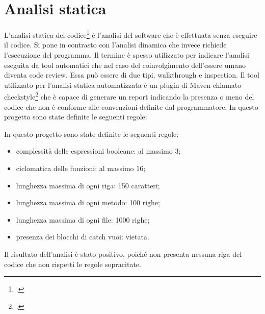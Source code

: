 \section{Analisi statica}\label{sec:analisi-statica}

L'analisi statica del codice\footcite{site:analisi_static} è l'analisi del software che è effettuata senza eseguire
il codice.
Si pone in contrasto con l'analisi dinamica che invece richiede l'esecuzione del
programma.
Il termine è spesso utilizzato per indicare l'analisi eseguita da tool
automatici che nel caso del coinvolgimento dell'essere umano diventa code review.
Essa può  essere di due tipi, \gls{walkthrough} e \gls{inspection}.
Il tool utilizzato per l'analisi statica automatizzata è un plugin di Maven
chiamato checkstyle\footcite{site:checkstyle} che è capace di generare un report indicando la presenza o
meno del codice che non è conforme alle convenzioni definite dal programmatore.
In questo progetto sono state definite le seguenti regole:

In questo progetto sono state definite le seguenti regole:
\begin{itemize}
    \item complessità delle espressioni booleane: al massimo 3;
    \item \gls{ciclomatica} delle funzioni: al massimo 16;
    \item lunghezza massima di ogni riga: 150 caratteri;
    \item lunghezza massima di ogni metodo: 100 righe;
    \item lunghezza massima di ogni file: 1000 righe;
    \item presenza dei blocchi di catch vuoi: vietata.
\end{itemize}

Il risultato dell'analisi è stato positivo, poiché non presenta nessuna riga del codice che non rispetti le regole sopracitate.